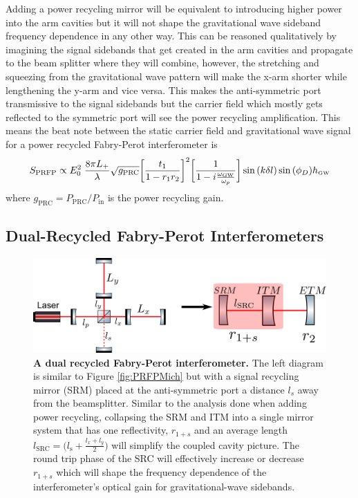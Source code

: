 		Adding a power recycling mirror will be equivalent to introducing higher power into the arm cavities but it will not shape the gravitational wave sideband frequency dependence in any other way.  This can be reasoned qualitatively by imagining the signal sidebands that get created in the arm cavities and propagate to the beam splitter where they will combine, however, the stretching and squeezing from the gravitational wave pattern will make the x-arm shorter while lengthening the y-arm and vice versa.  This makes the anti-symmetric port transmissive to the signal sidebands but the carrier field which mostly gets reflected to the symmetric port will see the power recycling amplification.  This means the beat note between the static carrier field and gravitational wave signal for a power recycled Fabry-Perot interferometer is
		\begin{equation}
		S_{\text{PRFP}} \propto E_0^2 \; \frac{8\pi L_+}{\lambda} \sqrt{g_{\text{PRC}}} \bigg[\frac{t_1}{1-r_1r_2}\bigg]^2 \bigg[\frac{1}{1 - i \frac{\omega_{\text{\tiny GW}}}{\omega_p}}\bigg] \sin{(k\delta l)} \sin{(\phi_{D})} h_{\text{\tiny GW}}
		\end{equation}
		where $g_{\text{PRC}} = P_{\text{PRC}}/P_{\text{in}}$ is the power recycling gain.
		
		\subsection{Dual-Recycled Fabry-Perot Interferometers}\label{sec:DRMI}
		
		\begin{figure}[ht]
			\centering
			\includegraphics[width=1.0 \textwidth]{../Figures/DRFP_Mich.png}
			\caption[A dual recycled Fabry-Perot interferometer.]
			{\textbf{A dual recycled Fabry-Perot interferometer.} 
			The left diagram is similar to Figure \ref{fig:PRFPMich} but with a signal recycling mirror (SRM) placed at the anti-symmetric port a distance $l_s$ away from the beamsplitter.  Similar to the analysis done when adding power recycling, collapsing the SRM and ITM into a single mirror system that has one reflectivity, $r_{1+s}$ and an average length $l_{\text{SRC}} = \big( l_\text{s} + \frac{l_x + l_y}{2} \big)$ will simplify the coupled cavity picture.  The round trip phase of the SRC will effectively increase or decrease $r_{1+s}$ which will shape the frequency dependence of the interferometer's optical gain for gravitational-wave sidebands.
			}
			\label{fig:DRFPMich}
		\end{figure}
		
